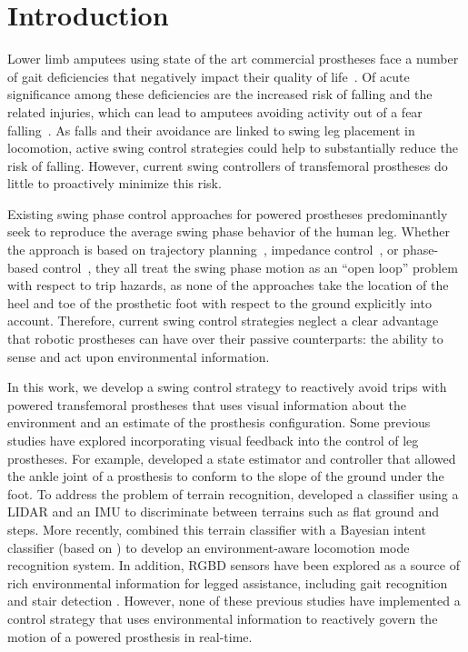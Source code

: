 \section{Introduction}
Lower limb amputees using state of the art commercial prostheses face a number
of gait deficiencies that negatively impact their quality of
life~\citep{gauthier1999enabling}. Of acute significance among these
deficiencies are the increased risk of falling and the related injuries, which
can lead to amputees avoiding activity out of a fear
falling~\citep{miller2001prevalence}.  As falls and their avoidance are linked
to swing leg placement in locomotion, active swing control strategies could help
to substantially reduce the risk of falling. However, current swing controllers
of transfemoral prostheses do little to proactively minimize this risk. 

Existing swing phase control approaches for powered prostheses predominantly
seek to reproduce the average swing phase behavior of the human leg. Whether the
approach is based on trajectory planning~\citep{lenzi2014speed}, impedance
control~\citep{sup2009preliminary}, or phase-based
control~\citep{quintero2016preliminary}, they all treat the swing phase motion
as an ``open loop'' problem with respect to trip hazards, as none of the
approaches take the location of the heel and toe of the prosthetic foot with
respect to the ground explicitly into account. Therefore, current swing control
strategies neglect a clear advantage that robotic prostheses can have over their
passive counterparts: the ability to sense and act upon environmental
information. 


In this work, we develop a swing control strategy to reactively avoid trips with
powered transfemoral prostheses that uses visual information about the
environment and an estimate of the prosthesis configuration. Some previous
studies have explored incorporating visual feedback into the control of leg
prostheses. For example, \citet{scandaroli2009estimation} developed a state
estimator and controller that allowed the ankle joint of a prosthesis to conform
to the slope of the ground under the foot. To address the problem of terrain
recognition, \citet{zhang2011preliminary} developed a classifier using a LIDAR
and an IMU to discriminate between terrains such as flat ground and steps. More
recently, \citet{liu2016development} combined this terrain classifier with a
Bayesian intent classifier (based on \citep{du2012toward}) to develop an
environment-aware locomotion mode recognition system. In addition, RGBD sensors
have been explored as a source of rich environmental information for legged
assistance, including gait recognition \citep{massalin2017user} and stair
detection \citep{krausz2015depth,duan2018real}. However, none of these previous
studies have implemented a control strategy that uses environmental
information to reactively govern the motion of a powered prosthesis in
real-time. 

